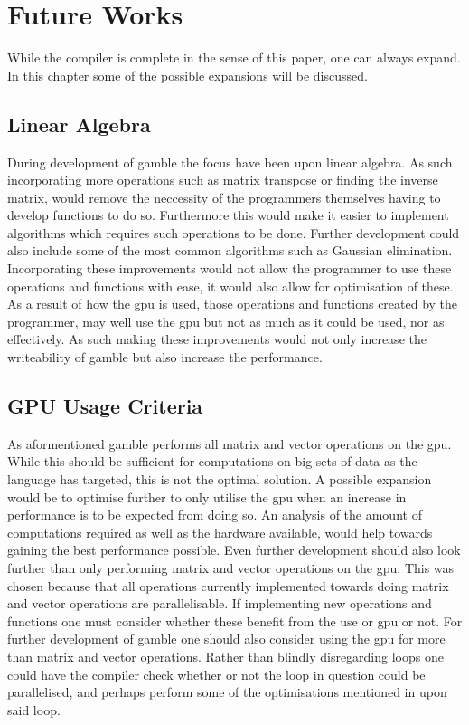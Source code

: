 \chapter{Future Works}\label{cha:future_works}
While the compiler is complete in the sense of this paper, one can always expand.
In this chapter some of the possible expansions will be discussed.

\section{Linear Algebra}\label{improve:LIAL}
During development of \gls{gamble} the focus have been upon linear algebra.
As such incorporating more operations such as matrix transpose or finding the inverse matrix, would remove the neccessity of the programmers themselves having to develop functions to do so.
Furthermore this would make it easier to implement algorithms which requires such operations to be done.
Further development could also include some of the most common algorithms such as Gaussian elimination.
Incorporating these improvements would not allow the programmer to use these operations and functions with ease, it would also allow for optimisation of these.
As a result of how the \acrshort{gpu} is used, those operations and functions created by the programmer, may well use the \acrshort{gpu} but not as much as it could be used, nor as effectively.
As such making these improvements would not only increase the writeability of \gls{gamble} but also increase the performance.

\section{GPU Usage Criteria}
As aformentioned \gls{gamble} performs all matrix and vector operations on the \acrshort{gpu}.
While this should be sufficient for computations on big sets of data as the language has targeted, this is not the optimal solution.
A possible expansion would be to optimise further to only utilise the \acrshort{gpu} when an increase in performance is to be expected from doing so.
An analysis of the amount of computations required as well as the hardware available, would help towards gaining the best performance possible.
Even further development should also look further than only performing matrix and vector operations on the \acrshort{gpu}.
This was chosen because that all operations currently implemented towards doing matrix and vector operations are parallelisable.
If implementing new operations and functions one must consider whether these benefit from the use or \acrshort{gpu} or not.
For further development of \gls{gamble} one should also consider using the \acrshort{gpu} for more than matrix and vector operations. 
Rather than blindly disregarding loops one could have the compiler check whether or not the loop in question could be parallelised, and perhaps perform some of the optimisations mentioned in  upon said loop.
 
